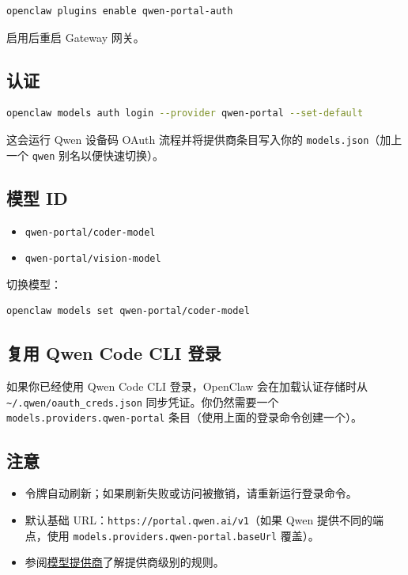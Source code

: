 \begin{lstlisting}[language=bash]
openclaw plugins enable qwen-portal-auth
\end{lstlisting}


启用后重启 Gateway 网关。

\subsection{认证}


\begin{lstlisting}[language=bash]
openclaw models auth login --provider qwen-portal --set-default
\end{lstlisting}


这会运行 Qwen 设备码 OAuth 流程并将提供商条目写入你的 \texttt{models.json}（加上一个 \texttt{qwen} 别名以便快速切换）。

\subsection{模型 ID}


\begin{itemize}
  \item \texttt{qwen-portal/coder-model}
  \item \texttt{qwen-portal/vision-model}
\end{itemize}


切换模型：

\begin{lstlisting}[language=bash]
openclaw models set qwen-portal/coder-model
\end{lstlisting}


\subsection{复用 Qwen Code CLI 登录}


如果你已经使用 Qwen Code CLI 登录，OpenClaw 会在加载认证存储时从 \texttt{\textasciitilde{}/.qwen/oauth\_creds.json} 同步凭证。你仍然需要一个 \texttt{models.providers.qwen-portal} 条目（使用上面的登录命令创建一个）。

\subsection{注意}


\begin{itemize}
  \item 令牌自动刷新；如果刷新失败或访问被撤销，请重新运行登录命令。
  \item 默认基础 URL：\texttt{https://portal.qwen.ai/v1}（如果 Qwen 提供不同的端点，使用 \texttt{models.providers.qwen-portal.baseUrl} 覆盖）。
  \item 参阅\href{/concepts/model-providers}{模型提供商}了解提供商级别的规则。
\end{itemize}



